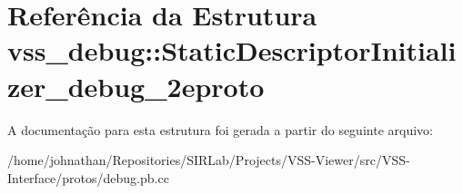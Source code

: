 \hypertarget{structvss__debug_1_1StaticDescriptorInitializer__debug__2eproto}{}\section{Referência da Estrutura vss\+\_\+debug\+:\+:Static\+Descriptor\+Initializer\+\_\+debug\+\_\+2eproto}
\label{structvss__debug_1_1StaticDescriptorInitializer__debug__2eproto}


A documentação para esta estrutura foi gerada a partir do seguinte arquivo\+:\begin{DoxyCompactItemize}
\item 
/home/johnathan/\+Repositories/\+S\+I\+R\+Lab/\+Projects/\+V\+S\+S-\/\+Viewer/src/\+V\+S\+S-\/\+Interface/protos/debug.\+pb.\+cc\end{DoxyCompactItemize}
